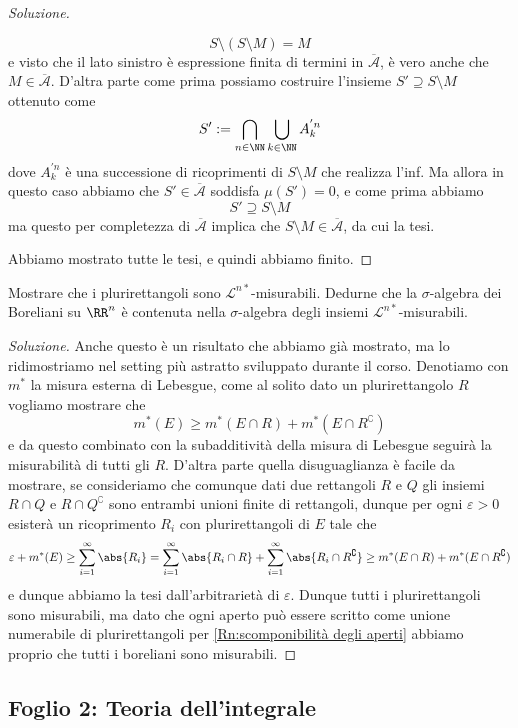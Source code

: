 \documentclass[11pt]{scrartcl}
\begin{document}
\begin{proof}[Soluzione]
\begin{enumerate}
			$$S\setminus \left(S\setminus M\right)=M$$
			e visto che il lato sinistro è espressione finita di termini in $\overline{\mathcal{A}}$, è vero anche che $M\in \overline{\mathcal{A}}$. D'altra parte come prima possiamo costruire l'insieme $S'\supseteq S\setminus M$ ottenuto come 
			$$S':=\bigcap_{n\in\NN}\bigcup_{k\in\NN}A_k^{'n}$$
			dove $A_k^{'n}$ è una successione di ricoprimenti di $S\setminus M$ che realizza l'inf. Ma allora in questo caso abbiamo che $S'\in \overline{\mathcal{A}}$ soddisfa $\mu(S')=0$, e come prima abbiamo 
			$$S'\supseteq S\setminus M$$
			ma questo per completezza di $\overline{\mathcal{A}}$ implica che $S\setminus M\in \overline{\mathcal{A}}$, da cui la tesi. 
		\end{enumerate}
		Abbiamo mostrato tutte le tesi, e quindi abbiamo finito.
	\end{proof}
	\begin{exercise}
		Mostrare che i plurirettangoli sono $\mathscr{L}^{n*}$-misurabili. Dedurne che la $\sigma$-algebra dei Boreliani su $\RR^n$ è contenuta nella $\sigma$-algebra degli insiemi $\mathscr{L}^{n*}$-misurabili.
	\end{exercise}
	\begin{proof}[Soluzione]
		Anche questo è un risultato che abbiamo già mostrato, ma lo ridimostriamo nel setting più astratto sviluppato durante il corso. Denotiamo con $m^*$ la misura esterna di Lebesgue, come al solito dato un plurirettangolo $R$ vogliamo mostrare che
		$$m^*(E)\ge m^*\left(E\cap R\right)+m^*\left(E\cap R^\complement\right)$$
		e da questo combinato con la subadditività della misura di Lebesgue seguirà la misurabilità di tutti gli $R$. D'altra parte quella disuguaglianza è facile da mostrare, se consideriamo che comunque dati due rettangoli $R$ e $Q$ gli insiemi $R\cap Q$ e $R\cap Q^\complement$ sono entrambi unioni finite di rettangoli, dunque per ogni $\varepsilon>0$ esisterà un ricoprimento $R_i$ con plurirettangoli di $E$ tale che
		$$\varepsilon+m^*(E)\ge \sum_{i=1}^\infty \abs{R_i}=\sum_{i=1}^{\infty}\abs{R_i\cap R}+\sum_{i=1}^\infty \abs{R_i\cap R^\complement}\ge m^*(E\cap R)+m^*(E\cap R^\complement)$$
		e dunque abbiamo la tesi dall'arbitrarietà di $\varepsilon$. Dunque tutti i plurirettangoli sono misurabili, ma dato che ogni aperto può essere scritto come unione numerabile di plurirettangoli per \ref{Rn:scomponibilità degli aperti} abbiamo proprio che tutti i boreliani sono misurabili.
	\end{proof}
	
	\subsection{Foglio 2: Teoria dell'integrale}
	
\end{document}
